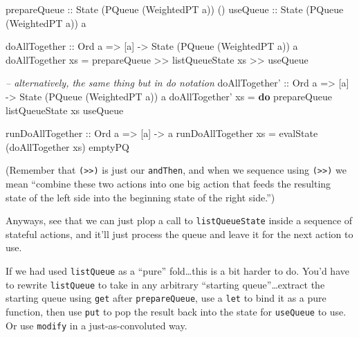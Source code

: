 \documentclass[]{article}
\newenvironment{Shaded}{}{}
\newcommand{\KeywordTok}[1]{\textcolor[rgb]{0.00,0.44,0.13}{\textbf{{#1}}}}
\newcommand{\DataTypeTok}[1]{\textcolor[rgb]{0.56,0.13,0.00}{{#1}}}
\newcommand{\CommentTok}[1]{\textcolor[rgb]{0.38,0.63,0.69}{\textit{{#1}}}}
\newcommand{\OtherTok}[1]{\textcolor[rgb]{0.00,0.44,0.13}{{#1}}}
\newcommand{\FunctionTok}[1]{\textcolor[rgb]{0.02,0.16,0.49}{{#1}}}
\newcommand{\NormalTok}[1]{{#1}}
\begin{document}
\begin{Shaded}
\begin{Highlighting}[]
\OtherTok{prepareQueue ::} \DataTypeTok{State} \NormalTok{(}\DataTypeTok{PQueue} \NormalTok{(}\DataTypeTok{WeightedPT} \NormalTok{a)) ()}
\OtherTok{useQueue     ::} \DataTypeTok{State} \NormalTok{(}\DataTypeTok{PQueue} \NormalTok{(}\DataTypeTok{WeightedPT} \NormalTok{a)) a}

\OtherTok{doAllTogether ::} \DataTypeTok{Ord} \NormalTok{a }\OtherTok{=>} \NormalTok{[a] }\OtherTok{->} \DataTypeTok{State} \NormalTok{(}\DataTypeTok{PQueue} \NormalTok{(}\DataTypeTok{WeightedPT} \NormalTok{a)) a}
\NormalTok{doAllTogether xs }\FunctionTok{=} \NormalTok{prepareQueue }\FunctionTok{>>} \NormalTok{listQueueState xs }\FunctionTok{>>} \NormalTok{useQueue}

\CommentTok{-- alternatively, the same thing but in do notation}
\OtherTok{doAllTogether' ::} \DataTypeTok{Ord} \NormalTok{a }\OtherTok{=>} \NormalTok{[a] }\OtherTok{->} \DataTypeTok{State} \NormalTok{(}\DataTypeTok{PQueue} \NormalTok{(}\DataTypeTok{WeightedPT} \NormalTok{a)) a}
\NormalTok{doAllTogether' xs }\FunctionTok{=} \KeywordTok{do}
    \NormalTok{prepareQueue}
    \NormalTok{listQueueState xs}
    \NormalTok{useQueue}

\OtherTok{runDoAllTogether ::} \DataTypeTok{Ord} \NormalTok{a }\OtherTok{=>} \NormalTok{[a] }\OtherTok{->} \NormalTok{a}
\NormalTok{runDoAllTogether xs }\FunctionTok{=} \NormalTok{evalState (doAllTogether xs) emptyPQ}
\end{Highlighting}
\end{Shaded}

(Remember that \texttt{(\textgreater{}\textgreater{})} is just our
\texttt{andThen}, and when we sequence using
\texttt{(\textgreater{}\textgreater{})} we mean ``combine these two
actions into one big action that feeds the resulting state of the left
side into the beginning state of the right side.'')

Anyways, see that we can just plop a call to \texttt{listQueueState}
inside a sequence of stateful actions, and it'll just process the queue
and leave it for the next action to use.

If we had used \texttt{listQueue} as a ``pure'' fold\ldots{}this is a
bit harder to do. You'd have to rewrite \texttt{listQueue} to take in
any arbitrary ``starting queue''\ldots{}extract the starting queue using
\texttt{get} after \texttt{prepareQueue}, use a \texttt{let} to bind it
as a pure function, then use \texttt{put} to pop the result back into
the state for \texttt{useQueue} to use. Or use \texttt{modify} in a
just-as-convoluted way.
\end{document}
